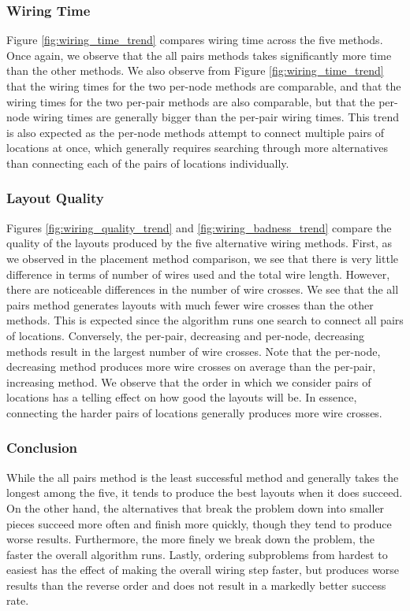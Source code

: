 \subsubsection{Wiring Time}
Figure \ref{fig:wiring_time_trend} compares wiring time across
the five methods. Once again, we observe that the all pairs methods takes
significantly more time than the other methods. We also observe from Figure
\ref{fig:wiring_time_trend} that the wiring times for the two per-node methods
are comparable, and that the wiring times for the two per-pair methods are also
comparable, but that the per-node wiring times are generally bigger than the
per-pair wiring times. This trend is also expected as the per-node methods
attempt to connect multiple pairs of locations at once, which generally requires
searching through more alternatives than
connecting each of the pairs of locations individually.

\subsubsection{Layout Quality}
Figures \ref{fig:wiring_quality_trend} and
\ref{fig:wiring_badness_trend} compare the
quality of the layouts produced by the five alternative wiring methods. First,
as we observed in the placement method comparison, we see that there is very
little difference in terms of number of wires used and the total wire length.
However, there are noticeable differences in the number of wire crosses. We see
that the all pairs method generates layouts with much fewer wire crosses than
the other methods. This is expected since the algorithm runs one search to
connect all pairs of locations. Conversely, the per-pair, decreasing and
per-node, decreasing methods
result in the largest number of wire crosses. Note that
the per-node, decreasing method produces more wire crosses on average than the
per-pair,
increasing method. We observe that the order in which we consider pairs of
locations has a telling effect on how good the layouts will be. In essence,
connecting the harder pairs of locations generally produces more wire crosses.

\subsubsection{Conclusion}
While the all pairs method is the least successful
method and generally takes the longest among the five,
it tends to produce the best layouts when it does succeed. On the other hand,
the alternatives that break the problem down into smaller pieces succeed more
often and finish more quickly, though they tend to produce worse results.
Furthermore,
the more finely we break down the problem, the faster the overall algorithm runs.
Lastly, ordering subproblems from hardest to easiest has the effect of making the
overall wiring step faster, but produces worse results than the reverse
order and does not result in a markedly better success rate.

